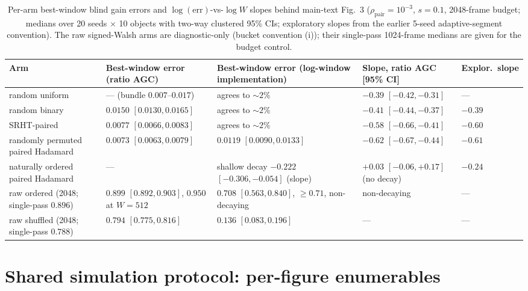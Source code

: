 \documentclass[journal,twoside]{IEEEtran}
\begin{document}
\begin{table}[t]
\centering
\small
\caption{Per-arm best-window blind gain errors and $\log(\mathrm{err})$-vs-$\log W$ slopes behind main-text Fig.~3 ($\rho_{\mathrm{pair}}=10^{-3}$, $s=0.1$, 2048-frame budget; medians over 20 seeds $\times$ 10 objects with two-way clustered 95\% CIs; exploratory slopes from the earlier 5-seed adaptive-segment convention). The raw signed-Walsh arms are diagnostic-only (bucket convention (i)); their single-pass 1024-frame medians are given for the budget control.}
\label{tab:s2}
\begin{tabular}{@{}p{}p{}p{}p{}p{}@{}}
\toprule
Arm & Best-window error (ratio AGC) & Best-window error (log-window implementation) & Slope, ratio AGC [95\% CI] & Explor.\ slope \\
\midrule
random uniform & --- (bundle $0.007$--$0.017$) & agrees to $\sim2\%$ & $-0.39$ $[-0.42,-0.31]$ & --- \\
random binary & $0.0150$ $[0.0130,0.0165]$ & agrees to $\sim2\%$ & $-0.41$ $[-0.44,-0.37]$ & $-0.39$ \\
SRHT-paired & $0.0077$ $[0.0066,0.0083]$ & agrees to $\sim2\%$ & $-0.58$ $[-0.66,-0.41]$ & $-0.60$ \\
randomly permuted paired Hadamard & $0.0073$ $[0.0063,0.0079]$ & $0.0119$ $[0.0090,0.0133]$ & $-0.62$ $[-0.67,-0.44]$ & $-0.61$ \\
naturally ordered paired Hadamard & --- & shallow decay $-0.222$ $[-0.306,-0.054]$ (slope) & $+0.03$ $[-0.06,+0.17]$ (no decay) & $-0.24$ \\
raw ordered (2048; single-pass $0.896$) & $0.899$ $[0.892,0.903]$, $0.950$ at $W{=}512$ & $0.708$ $[0.563,0.840]$, $\ge0.71$, non-decaying & non-decaying & --- \\
raw shuffled (2048; single-pass $0.788$) & $0.794$ $[0.775,0.816]$ & $0.136$ $[0.083,0.196]$ & --- & --- \\
\bottomrule
\end{tabular}
\end{table}

\section{Shared simulation protocol: per-figure enumerables}
\label{sec:s5}
\end{document}
